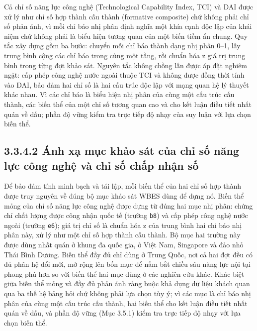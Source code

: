 \documentclass[
  a4paper,
  13pt]{extreport}
\begin{document}
Cả chỉ số năng lực công nghệ (Technological Capability Index, TCI) và
DAI được xử lý như chỉ số hợp thành cấu thành (formative composite) chứ
không phải chỉ số phản ánh, vì mỗi chỉ báo nhị phân định nghĩa một khía
cạnh độc lập của khái niệm chứ không phải là biểu hiện tương quan của
một biến tiềm ẩn chung. Quy tắc xây dựng gồm ba bước: chuyển mỗi chỉ báo
thành dạng nhị phân 0--1, lấy trung bình cộng các chỉ báo trong cùng một
tầng, rồi chuẩn hóa z giá trị trung bình trong từng đợt khảo sát. Nguyên
tắc không chồng lấn được áp đặt nghiêm ngặt: cấp phép công nghệ nước
ngoài thuộc TCI và không được đồng thời tính vào DAI, bảo đảm hai chỉ số
là hai cấu trúc độc lập với mạng quan hệ lý thuyết khác nhau. Vì các chỉ
báo là biểu hiện nhị phân của cùng một cấu trúc cấu thành, các biến thể
của một chỉ số tương quan cao và cho kết luận điều tiết nhất quán về
dấu; phần độ vững kiểm tra trực tiếp độ nhạy của suy luận với lựa chọn
biến thể.

\hypertarget{uxe1nh-xux1ea1-mux1ee5c-khux1ea3o-suxe1t-cux1ee7a-chux1ec9-sux1ed1-nux103ng-lux1ef1c-cuxf4ng-nghux1ec7-vuxe0-chux1ec9-sux1ed1-chux1ea5p-nhux1eadn-sux1ed1}{%
\subsection{3.3.4.2 Ánh xạ mục khảo sát của chỉ số năng lực công nghệ và
chỉ số chấp nhận
số}\label{uxe1nh-xux1ea1-mux1ee5c-khux1ea3o-suxe1t-cux1ee7a-chux1ec9-sux1ed1-nux103ng-lux1ef1c-cuxf4ng-nghux1ec7-vuxe0-chux1ec9-sux1ed1-chux1ea5p-nhux1eadn-sux1ed1}}

Để bảo đảm tính minh bạch và tái lập, mỗi biến thể của hai chỉ số hợp
thành được truy nguyên về đúng bộ mục khảo sát WBES dùng để dựng nó.
Biến thể mỏng của chỉ số năng lực công nghệ được dựng từ đúng hai mục
nhị phân: chứng chỉ chất lượng được công nhận quốc tế (trường
\texttt{b8}) và cấp phép công nghệ nước ngoài (trường \texttt{e6}); giá
trị chỉ số là chuẩn hóa z của trung bình hai chỉ báo nhị phân này, xử lý
như một chỉ số hợp thành cấu thành. Bộ mục hai trường này được dùng nhất
quán ở khung đa quốc gia, ở Việt Nam, Singapore và đảo nhỏ Thái Bình
Dương. Biến thể đầy đủ chỉ dùng ở Trung Quốc, nơi cả hai đợt đều có đủ
phân hệ đổi mới, mở rộng lên bốn mục để nắm bắt chiều sâu năng lực nội
tại phong phú hơn so với biến thể hai mục dùng ở các nghiên cứu khác.
Khác biệt giữa biến thể mỏng và đầy đủ phản ánh ràng buộc khả dụng dữ
liệu khách quan qua ba thế hệ bảng hỏi chứ không phải lựa chọn tùy ý; vì
các mục là chỉ báo nhị phân của cùng một cấu trúc cấu thành, hai biến
thể cho kết luận điều tiết nhất quán về dấu, và phần độ vững (Mục 3.5.1)
kiểm tra trực tiếp độ nhạy với lựa chọn biến thể.
\end{document}
